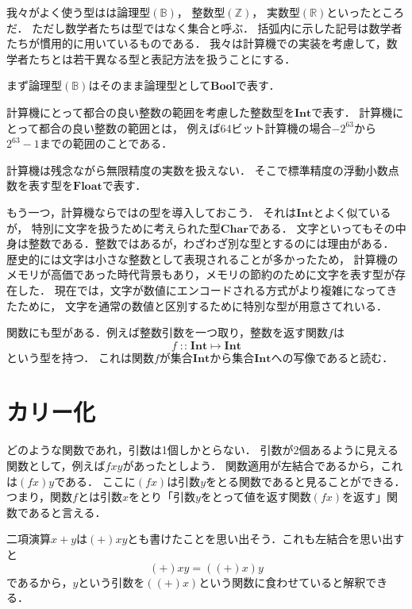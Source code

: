 \documentclass[a5paper,draft]{jsbook}
\newcommand{\mathSpecialSet}[1]{\mathbb{#1}} %
\newcommand{\mathTypeName}[1]{\mathbf{#1}}
\newcommand{\mathBinaryOperator}[1]{\operatorname{#1}}
\newcommand{\mathIn}{\mathBinaryOperator{:\!:}}
\newcommand{\mathMapsTo}{\mapsto}
\newcommand{\mathMorph}[2]{#1\mathMapsTo#2}
\begin{document}
我々がよく使う型はは論理型$(\mathSpecialSet{B})$，
整数型$(\mathSpecialSet{Z})$，
実数型$(\mathSpecialSet{R})$といったところだ．
ただし数学者たちは型ではなく集合と呼ぶ．
括弧内に示した記号は数学者たちが慣用的に用いているものである．
我々は計算機での実装を考慮して，数学者たちとは若干異なる型と表記方法を扱うことにする．

まず論理型$(\mathSpecialSet{B})$はそのまま論理型として$\mathTypeName{Bool}$で表す．

計算機にとって都合の良い整数の範囲を考慮した整数型を$\mathTypeName{Int}$で表す．
計算機にとって都合の良い整数の範囲とは，
例えば64ビット計算機の場合$-2^{63}$から$2^{63}-1$までの範囲のことである．

計算機は残念ながら無限精度の実数を扱えない．
そこで標準精度の浮動小数点数を表す型を$\mathTypeName{Float}$で表す．

もう一つ，計算機ならではの型を導入しておこう．
それは$\mathTypeName{Int}$とよく似ているが，
特別に文字を扱うために考えられた型$\mathTypeName{Char}$である．
文字といってもその中身は整数である．整数ではあるが，わざわざ別な型とするのには理由がある．
歴史的には文字は小さな整数として表現されることが多かったため，
計算機のメモリが高価であった時代背景もあり，メモリの節約のために文字を表す型が存在した．
現在では，文字が数値にエンコードされる方式がより複雑になってきたために，
文字を通常の数値と区別するために特別な型が用意さてれいる．

関数にも型がある．例えば整数引数を一つ取り，整数を返す関数$f$は
\begin{equation}
f\mathIn\mathMorph{\mathTypeName{Int}}{\mathTypeName{Int}}
\end{equation}
という型を持つ．
これは関数$f$が集合$\mathTypeName{Int}$から集合$\mathTypeName{Int}$への写像であると読む．

\section{カリー化}

どのような関数であれ，引数は1個しかとらない．
引数が2個あるように見える関数として，例えば$fxy$があったとしよう．
関数適用が左結合であるから，これは$\left(fx\right)y$である．
ここに$\left(fx\right)$は引数$y$をとる関数であると見ることができる．
つまり，関数$f$とは引数$x$をとり「引数$y$をとって値を返す関数$\left(fx\right)$を返す」関数であると言える．

二項演算$x+y$は$(+)xy$とも書けたことを思い出そう．これも左結合を思い出すと
\begin{equation}
(+)xy=\left((+)x\right)y
\end{equation}
であるから，$y$という引数を$\left((+)x\right)$という関数に食わせていると解釈できる．
\end{document}
